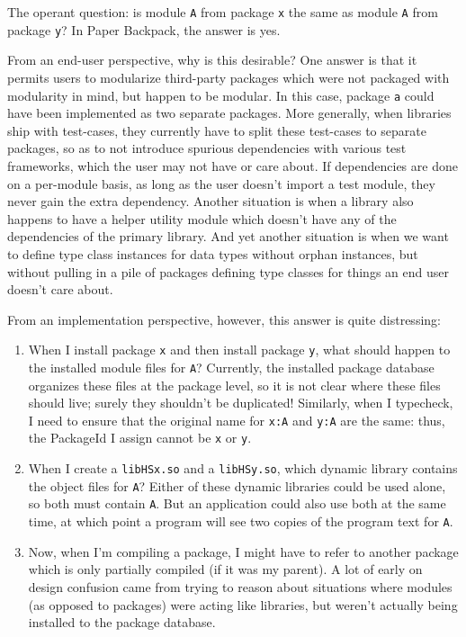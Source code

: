\documentclass{article}
\begin{document}
The operant question: is module
\verb|A| from package \verb|x| the same as module \verb|A| from package
\verb|y|?  In Paper Backpack, the answer is yes.

From an end-user perspective, why is this desirable?  One answer is that
it permits users to modularize third-party packages which were not
packaged with modularity in mind, but happen to be modular.  In this
case, package \verb|a| could have been implemented as two separate
packages. More generally, when libraries ship with test-cases, they currently have to
split these test-cases to separate packages, so as to not introduce
spurious dependencies with various test frameworks, which the user may
not have or care about.  If dependencies are done on a per-module basis,
as long as the user doesn't import a test module, they never gain the
extra dependency.  Another situation is when a library also happens to
have a helper utility module which doesn't have any of the dependencies
of the primary library.  And yet another situation is when we want to
define type class instances for data types without orphan instances, but
without pulling in a pile of packages defining type classes for things
an end user doesn't care about.

From an implementation perspective, however, this answer is quite distressing:

\begin{enumerate}
    \item When I install package \verb|x| and then install package
        \verb|y|, what should happen to the installed module files for
        \verb|A|?  Currently, the installed package database organizes
        these files at the package level, so it is not clear where these
        files should live; surely they shouldn't be duplicated!
        Similarly, when I typecheck, I need to ensure that the original
        name for \verb|x:A| and \verb|y:A| are the same: thus, the
        PackageId I assign cannot be \verb|x| or \verb|y|.

    \item When I create a \verb|libHSx.so| and a \verb|libHSy.so|, which
        dynamic library contains the object files for \verb|A|?  Either
        of these dynamic libraries could be used alone, so both must
        contain \verb|A|. But an application could also use both at the
        same time, at which point a program will see two copies of the
        program text for \verb|A|.

    \item Now, when I'm compiling a package, I might have to refer to
        another package which is only partially compiled (if it was my
        parent).  A lot of early on design confusion came from trying to
        reason about situations where modules (as opposed to packages)
        were acting like libraries, but weren't actually being installed
        to the package database.
\end{enumerate}
\end{document}
